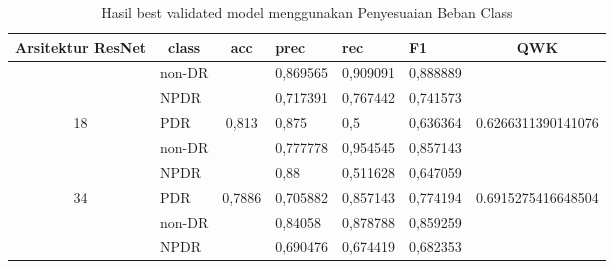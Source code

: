     \begin{table}[H]
        \begin{center}
        \caption{Hasil best validated model menggunakan Penyesuaian Beban Class}
        \label{tb:HasilValClassWeight}
        \begin{tabular}{|c|l|c|l|l|l|c|}
            \hline
            \rowcolor[HTML]{C0C0C0} 
            Arsitektur ResNet     & \multicolumn{1}{c|}{\cellcolor[HTML]{C0C0C0}class} & acc                      & prec     & rec      & F1       & QWK                                  \\ \hline
                                  & non-DR                                             &                          & 0,869565 & 0,909091 & 0,888889 &                                      \\ \cline{2-2} \cline{4-6}
                                  & NPDR                                               &                          & 0,717391 & 0,767442 & 0,741573 &                                      \\ \cline{2-2} \cline{4-6}
            \multirow{-3}{*}{18}  & PDR                                                & \multirow{-3}{*}{0,813}  & 0,875    & 0,5      & 0,636364 & \multirow{-3}{*}{0.6266311390141076} \\ \hline
                                  & non-DR                                             &                          & 0,777778 & 0,954545 & 0,857143 &                                      \\ \cline{2-2} \cline{4-6}
                                  & NPDR                                               &                          & 0,88     & 0,511628 & 0,647059 &                                      \\ \cline{2-2} \cline{4-6}
            \multirow{-3}{*}{34}  & PDR                                                & \multirow{-3}{*}{0,7886} & 0,705882 & 0,857143 & 0,774194 & \multirow{-3}{*}{0.6915275416648504} \\ \hline
                                  & non-DR                                             &                          & 0,84058  & 0,878788 & 0,859259 &                                      \\ \cline{2-2} \cline{4-6}
                                  & NPDR                                               &                          & 0,690476 & 0,674419 & 0,682353 &                                      \\ \cline{2-2} \cline{4-6}

\end{tabular}
\end{center}
\end{table}
